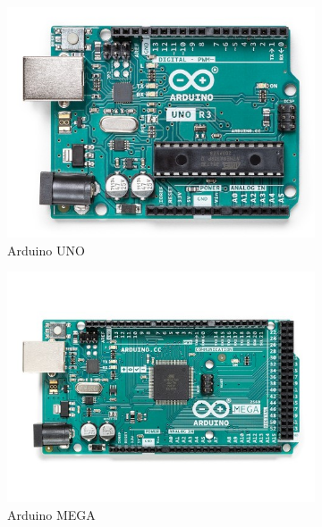 \documentclass[scheme=chinese,a4paper]{article}
\begin{document}
\begin{figure}[H]
  \begin{subfigure}[t]{0.25\textwidth}
    \includegraphics[width=\textwidth]{arduino_uno.jpg}
    \caption{Arduino UNO}
  \end{subfigure}
  \begin{subfigure}[t]{0.45\textwidth}
    \includegraphics[width=\textwidth]{arduino_mega.jpg}
    \caption{Arduino MEGA}
  \end{subfigure}
  \begin{subfigure}[t]{0.25\textwidth}

\end{subfigure}
\end{figure}
\end{document}
